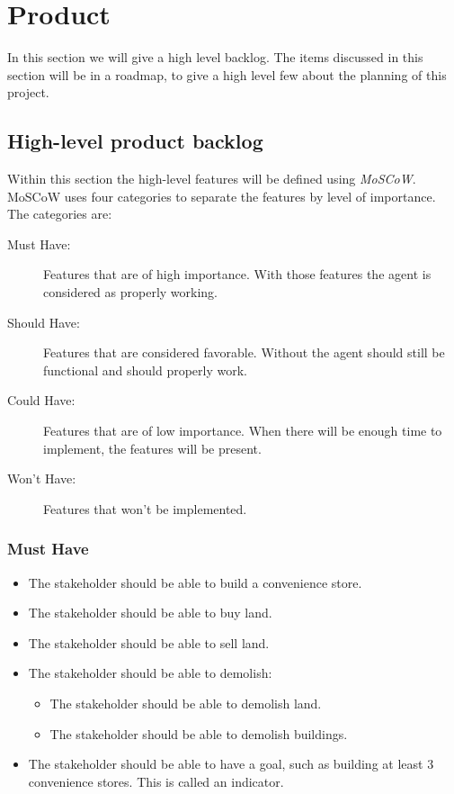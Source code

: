 \label{product}
\section{Product}
In this section we will give a high level backlog. The items discussed in this section will be in a roadmap, to give a high level few about the planning of this project.
\subsection{High-level product backlog}

Within this section the high-level features will be defined using \textit{MoSCoW}. MoSCoW uses four categories to separate the features by level of importance. The categories are:

\begin{description}
	\item[Must Have:] Features that are of high importance. With those features the agent is considered as properly working.
	\item[Should Have:] Features that are considered favorable. Without the agent should still be functional and should properly work.
	\item[Could Have:] Features that are of low importance. When there will be enough time to implement, the features will be present.
	\item[Won't Have:] Features that won't be implemented.
\end{description}

\subsubsection{Must Have}
\begin{itemize}
	\item The stakeholder should be able to build a convenience store.
	\item The stakeholder should be able to buy land.
	\item The stakeholder should be able to sell land.
	\item The stakeholder should be able to demolish:
		\begin{itemize}
			\item The stakeholder should be able to demolish land.
			\item The stakeholder should be able to demolish buildings.
		\end{itemize}
	\item The stakeholder should be able to have a goal, such as building at least 3 convenience stores. This is called an indicator.
\end{itemize}

